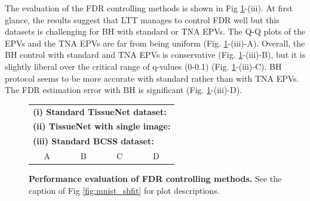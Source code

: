 \documentclass[10pt,letterpaper]{article}
\begin{document}

The evaluation of the FDR controlling methods is shown in Fig \ref{fig:ii}-(iii).
At first glance, the results suggest that LTT manages to control FDR well but this datasets is challenging for BH with standard or TNA EPVs.
The Q-Q plots of the EPVs and the TNA EPVs are far from being uniform (Fig. \ref{fig:ii}-(iii)-A).
Overall, the BH control with standard and TNA EPVs is conservative (Fig. \ref{fig:ii}-(iii)-B), but it is slightly liberal over the critical range of q-values (0-0.1) (Fig. \ref{fig:ii}-(iii)-C).
BH protocol seems to be more accurate with standard rather than with TNA EPVs.
The FDR estimation error with BH is significant (Fig. \ref{fig:ii}-(iii)-D). 

\begin{figure}
	\centering
	\begin{tabular}{cccc}
		\multicolumn{4}{l}{\bf (i) Standard TissueNet dataset:}\\		
		\multicolumn{4}{l}{\bf (ii) TissueNet with single image:}\\		
		\multicolumn{4}{l}{\bf (iii) Standard BCSS dataset:}\\		
		A & B & C & D
	\end{tabular}
	\caption{{\bf Performance evaluation of FDR controlling methods.}  See the caption of Fig \ref{fig:mnist_shfit} for plot descriptions.}
	\label{fig:ii}
\end{figure} 
\end{document}
